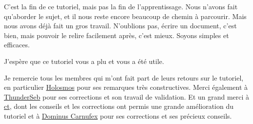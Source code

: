 C’est la fin de ce tutoriel, mais pas la fin de l’apprentissage. Nous n’avons fait qu’aborder le sujet, et il nous reste encore beaucoup de chemin à parcourir. Mais nous avons déjà fait un gros travail. N’oublions pas, écrire un document, c’est bien, mais pouvoir le relire facilement après, c’est mieux. Soyons simples et efficaces.

J’espère que ce tutoriel vous a plu et vous a été utile.

Je remercie tous les membres qui m’ont fait part de leurs retours sur le tutoriel, en particulier \href{https://zestedesavoir.com/membres/voir/Holosmos/}{Holosmos} pour ses remarques très constructives. Merci également à \href{https://zestedesavoir.com/membres/voir/ThunderSeb/}{ThunderSeb} pour ses corrections et son travail de validation. Et un grand merci à \href{https://zestedesavoir.com/membres/voir/ct/}{ct}, dont les conseils et les corrections ont permis une grande amélioration du tutoriel et à \href{https://zestedesavoir.com/membres/voir/Dominus Carnufex/}{Dominus Carnufex} pour ses corrections et ses précieux conseils.
